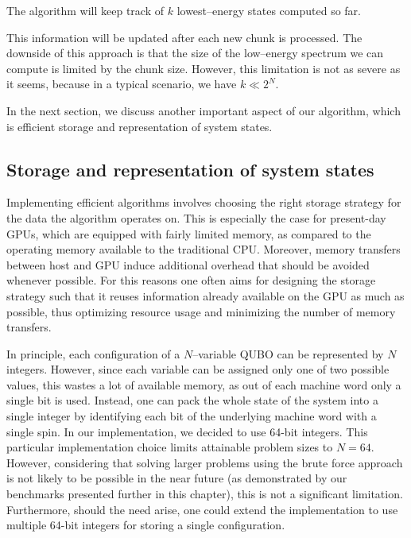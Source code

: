 The algorithm will keep track of $k$ lowest--energy states computed so far.

This information will be updated after each new chunk is processed. The
downside of this approach is that the size of the low--energy spectrum we can
compute is limited by the chunk size. However, this limitation is not as severe
as it seems, because in a typical scenario, we have $k \ll 2^{N}$.

In the next section, we discuss another important aspect of our algorithm,
which is efficient storage and representation of system states.

\subsection{Storage and representation of system states}
Implementing efficient algorithms involves choosing the right storage strategy
for the data the algorithm operates on. This is especially the case for
present-day GPUs, which are equipped with fairly limited memory, as compared to
the operating memory available to the traditional CPU. Moreover, memory
transfers between host and GPU induce additional overhead that should be
avoided whenever possible. For this reasons one often aims for designing the
storage strategy such that it reuses information already available on the GPU
as much as possible, thus optimizing resource usage and minimizing the number
of memory transfers.

In principle, each configuration of a $N$--variable QUBO can be represented by
$N$ integers. However, since each variable can be assigned only one of two
possible values, this wastes a lot of available memory, as out of each machine
word only a single bit is used. Instead, one can pack the whole state of the
system into a single integer by identifying each bit of the underlying machine
word with a single spin. In our implementation, we decided to use 64-bit
integers. This particular implementation choice limits attainable problem sizes
to $N=64$. However, considering that solving larger problems using the brute
force approach is not likely to be possible in the near future (as demonstrated
by our benchmarks presented further in this chapter), this is not a significant
limitation. Furthermore, should the need arise, one could extend the
implementation to use multiple 64-bit integers for storing a single
configuration.

